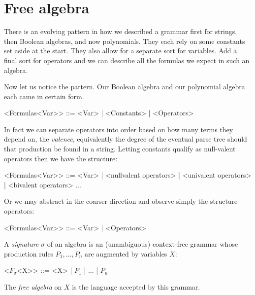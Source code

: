 \section{Free algebra}
There is an evolving pattern in how we described a grammar first for strings, 
then Boolean algebras, and now polynomials.  They each rely on some 
constants set aside at the start.  They also allow for a separate sort for
variables.  Add a final sort for operators and we can describe all the formulas 
we expect in such an algebra.

Now let us notice the pattern.  Our Boolean algebra and our polynomial algebra each 
came in certain form.
\begin{Gcode}[]
    <Formulas<Var>> ::= <Var>
            | <Constants>
            | <Operators>
\end{Gcode}
In fact we can separate operators into order based on how many terms they depend on,
the \emph{valence}, equivalently the degree of the eventual parse tree should that 
production be found in a string.  Letting constants qualify as null-valent operators 
then we have the structure:
\begin{Gcode}[]
    <Formulas<Var>> ::= <Var>
            | <nullvalent operators>
            | <univalent operators>
            | <bivalent operators>
            ...
\end{Gcode}
Or we may abstract in the coarser direction and observe simply the structure operators:
\begin{Gcode}[]
    <Formulas<Var>> ::= <Var>
                      | <Operators>
\end{Gcode}

\begin{definition}
    A \emph{signature} $\sigma$ of an algebra is an (unambiguous) context-free grammar 
    whose production rules $P_1,\ldots,P_n$ are augmented by variables $X$:
    \begin{Gcode}[]
        <$F_{\sigma}$<X>> ::= <X> | $P_1$ | $\ldots$ | $P_n$
    \end{Gcode}
    The \emph{free algebra} on $X$ is the language accepted by this grammar.
\end{definition}
